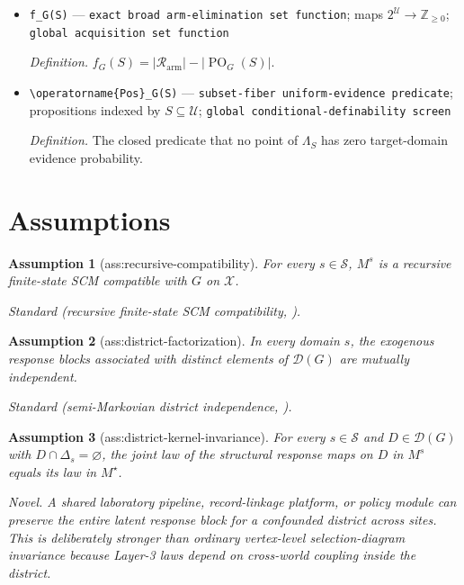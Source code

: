 \documentclass{article}
\newtheorem{assumption}{Assumption}
\begin{document}
\begin{itemize}
  \par\smallskip\noindent\emph{Definition.} \(\mathcal P_{\mathrm{full},G}=\operatorname{PO}_G(\mathcal U)\).
  \item \texttt{f\_\allowbreak{}G(S)} --- \texttt{exact broad arm-\allowbreak{}elimination set function}; maps \(2^{\mathcal U}\to\mathbb Z_{\geq0}\); \texttt{global acquisition set function}
  \par\smallskip\noindent\emph{Definition.} \(f_G(S)=\lvert\mathcal R_{\mathrm{arm}}\rvert-\lvert\operatorname{PO}_G(S)\rvert\).
  \item \texttt{\textbackslash{}\allowbreak{}operatorname\{Pos\}\allowbreak{}\_\allowbreak{}G(S)} --- \texttt{subset-\allowbreak{}fiber uniform-\allowbreak{}evidence predicate}; propositions indexed by \(S\subseteq\mathcal U\); \texttt{global conditional-\allowbreak{}definability screen}
  \par\smallskip\noindent\emph{Definition.} The closed predicate that no point of \(\Lambda_S\) has zero target-domain evidence probability.
\end{itemize}

\section{Assumptions}

\begin{assumption}[ass:recursive-compatibility]\label{ass:recursive-compatibility}
For every \(s\in\mathcal S\), \(M^s\) is a recursive finite-state SCM compatible with \(G\) on \(\mathcal X\).
\par\smallskip\noindent\emph{Standard} (recursive finite-state SCM compatibility, \cite{Pearl2000}).
\end{assumption}

\begin{assumption}[ass:district-factorization]\label{ass:district-factorization}
In every domain \(s\), the exogenous response blocks associated with distinct elements of \(\mathcal D(G)\) are mutually independent.
\par\smallskip\noindent\emph{Standard} (semi-Markovian district independence, \cite{ShpitserPearl2008}).
\end{assumption}

\begin{assumption}[ass:district-kernel-invariance]\label{ass:district-kernel-invariance}
For every \(s\in\mathcal S\) and \(D\in\mathcal D(G)\) with \(D\cap\Delta_s=\varnothing\), the joint law of the structural response maps on \(D\) in \(M^s\) equals its law in \(M^\star\).
\par\smallskip\noindent\emph{Novel.} A shared laboratory pipeline, record-linkage platform, or policy module can preserve the entire latent response block for a confounded district across sites. This is deliberately stronger than ordinary vertex-level selection-diagram invariance because Layer-3 laws depend on cross-world coupling inside the district.
\end{assumption}
\end{document}
